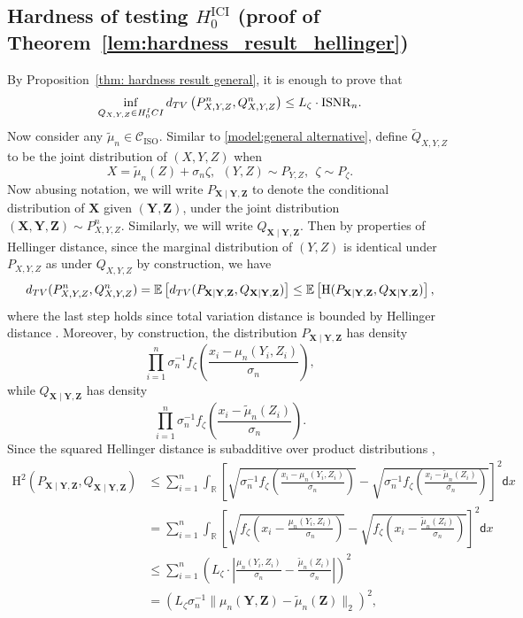 \documentclass[12pt]{article}
\newcommand{\R}{\mathbb{R}}
\newcommand{\EE}[1]{\mathbb{E}\left[{#1}\right]}
\newcommand{\ISNR}{\mathrm{ISNR}}
\newcommand{\ISO}{\mathrm{ISO}}
\newcommand{\bX}{\mathbf{X}}
\newcommand{\bY}{\mathbf{Y}}
\newcommand{\bZ}{\mathbf{Z}}
\newcommand{\TV}{\textnormal{d}_{\textnormal{TV}}}
\begin{document}
\subsection{Hardness of testing $H_0^{\mathrm{ICI}}$ (proof of Theorem~\ref{lem:hardness_result_hellinger})}
By Proposition~\ref{thm: hardness result general}, it is enough to prove that 
    \[
    \inf_{Q_{X,Y,Z}\in H_0^\textnormal{ICI}}\TV\left(P^n_{X,Y,Z},Q^n_{X,Y,Z}\right)\leq L_\zeta\cdot \ISNR_n.
    \]
    Now consider any $\tilde{\mu}_n \in \mathcal{C}_\ISO$. Similar to \eqref{model:general alternative}, define $\tilde{Q}_{X,Y,Z}$ to be the joint distribution of $(X,Y,Z)$ when 
    \[
    X= \tilde{\mu}_n(Z)+\sigma_n\zeta,~~ (Y,Z) \sim P_{Y,Z},~~\zeta \sim P_\zeta.
    \]
    Now abusing notation, we will write $P_{\bX\mid \bY,\bZ}$ to denote the conditional distribution of $\bX$ given $(\bY,\bZ)$, under the joint distribution $(\bX,\bY,\bZ)\sim P^n_{X,Y,Z}$. Similarly, we will write $Q_{\bX\mid \bY,\bZ}$. Then by properties of Hellinger distance, since the marginal distribution of $(Y,Z)$ is identical under $P_{X,Y,Z}$ as under $Q_{X,Y,Z}$ by construction, we have
    \[\TV(P^n_{X,Y,Z},Q^n_{X,Y,Z}) = \EE{\TV(P_{\bX\mid \bY,\bZ},Q_{\bX\mid \bY,\bZ})} \leq \EE{\mathrm{H}(P_{\bX\mid \bY,\bZ},Q_{\bX\mid \bY,\bZ})},\]
    where the last step holds since total variation distance is bounded by Hellinger distance \citep{le2000asymptotics}.    
   Moreover, by construction, the distribution $P_{\bX\mid\bY,\bZ}$ has density
    \[\prod_{i=1}^n \sigma_n^{-1}f_\zeta\left(\frac{x_i - \mu_n(Y_i,Z_i)}{\sigma_n}\right),\]
    while 
    $Q_{\bX\mid\bY,\bZ}$ has density
    \[\prod_{i=1}^n \sigma_n^{-1}f_\zeta\left(\frac{x_i - \tilde\mu_n(Z_i)}{\sigma_n}\right).\]
Since the squared Hellinger distance is subadditive over product distributions \citep[Appendix C.2]{canonne2020survey}, 
\begin{align*}
    \mathrm{H}^2\left(P_{\bX\mid\bY,\bZ},Q_{\bX\mid\bY,\bZ}\right) 
    &\leq \sum_{i=1}^n \int_\R \left[ \sqrt{\sigma_n^{-1}f_\zeta\left(\frac{x_i - \mu_n(Y_i,Z_i)}{\sigma_n}\right)} - \sqrt{\sigma_n^{-1}f_\zeta\left(\frac{x_i - \tilde\mu_n(Z_i)}{\sigma_n}\right)}\right]^2 \!\!\!\mathsf{d}x\\
    &=\sum_{i=1}^n \int_\R \left[ \sqrt{f_\zeta\left(x_i - \frac{\mu_n(Y_i,Z_i)}{\sigma_n}\right)} - \sqrt{f_\zeta\left(x_i - \frac{\tilde\mu_n(Z_i)}{\sigma_n}\right)}\right]^2 \!\!\!\mathsf{d}x\\
    &\leq \sum_{i=1}^n \left(L_\zeta\cdot \left|\frac{\mu_n(Y_i,Z_i)}{\sigma_n} -  \frac{\tilde\mu_n(Z_i)}{\sigma_n}\right|\right)^2\\
    &=\left(L_\zeta \sigma_n^{-1} \|\mu_n(\bY,\bZ) - \tilde\mu_n(\bZ)\|_2\right)^2,
\end{align*}
\end{document}
